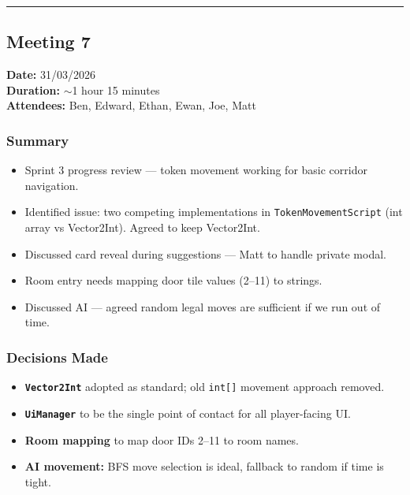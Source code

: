 \smallskip
\hrule
\smallskip

\subsection{Meeting 7}
\textbf{Date:} 31/03/2026 \\
\textbf{Duration:} $\sim$1 hour 15 minutes \\
\textbf{Attendees:} Ben, Edward, Ethan, Ewan, Joe, Matt

\subsubsection*{Summary}
\begin{itemize}
    \item Sprint 3 progress review --- token movement working for basic corridor navigation.
    \item Identified issue: two competing implementations in \texttt{TokenMovementScript} (int array vs Vector2Int). Agreed to keep Vector2Int.
    \item Discussed card reveal during suggestions --- Matt to handle private modal.
    \item Room entry needs mapping door tile values (2--11) to strings.
    \item Discussed AI --- agreed random legal moves are sufficient if we run out of time.
\end{itemize}

\subsubsection*{Decisions Made}
\begin{itemize}
    \item \textbf{\texttt{Vector2Int}} adopted as standard; old \texttt{int[]} movement approach removed.
    \item \textbf{\texttt{UiManager}} to be the single point of contact for all player-facing UI.
    \item \textbf{Room mapping} to map door IDs 2--11 to room names.
    \item \textbf{AI movement:} BFS move selection is ideal, fallback to random if time is tight.
\end{itemize}

